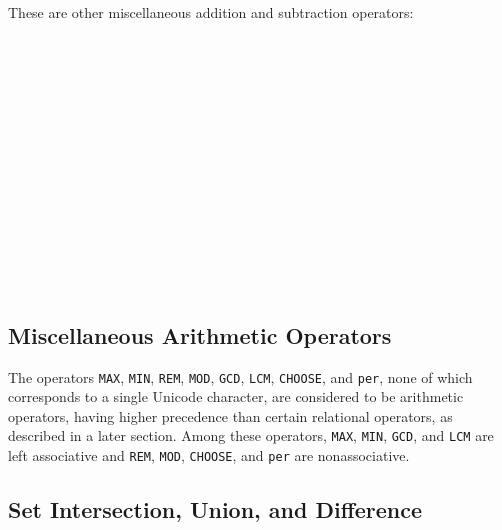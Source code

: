 These are other miscellaneous addition and subtraction operators:
\begin{tabbing}
\UnicodeKillLine
{} \\
 \\
 \\
 \\
 \\
 \\
 \\
 \\
 \\
 \\
 \\
 \\
 \\
\end{tabbing}


\subsection{Miscellaneous Arithmetic Operators}

The operators \texttt{MAX}, \texttt{MIN}, \texttt{REM}, \texttt{MOD}, \texttt{GCD},
\texttt{LCM}, \texttt{CHOOSE}, and \texttt{per}, none of which corresponds to a single
Unicode character, are considered to be arithmetic operators, having
higher precedence than certain relational operators, as described in
a later section.
Among these operators, \texttt{MAX}, \texttt{MIN}, \texttt{GCD}, and \texttt{LCM}
are left associative and \texttt{REM}, \texttt{MOD}, \texttt{CHOOSE}, and
\texttt{per} are nonassociative.

\subsection{Set Intersection, Union, and Difference}

